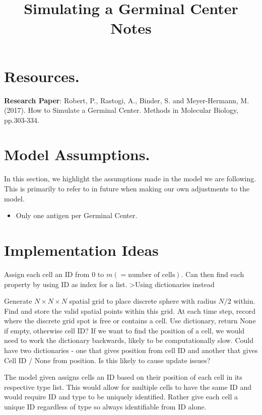 \documentclass[english]{article}
\begin{document}
\title{Simulating a Germinal Center Notes}
\maketitle

\tableofcontents
\pagebreak	

\section{Resources.}
\textbf{Research Paper}: Robert, P., Rastogi, A., Binder, S. and Meyer-Hermann, M. (2017). How to Simulate a Germinal Center. Methods in Molecular Biology, pp.303-334.


\section{Model Assumptions.}
In this section, we highlight the assumptions made in the model we are following. This is primarily to refer to in future when making our own adjustments to the model. 
\begin{itemize}
\item Only one antigen per Germinal Center. 

\end{itemize}


\section{Implementation Ideas}
Assign each cell an ID from 0 to $m(=\text{number of cells})$. Can then find each property by using ID as index for a list. >Using dictionaries instead

Generate $N\times N\times N$ spatial grid to place discrete sphere with radius $N/2$ within. Find and store the valid spatial points within this grid. At each time step, record where the discrete grid spot is free or contains a cell. Use dictionary, return None if empty, otherwise cell ID? If we want to find the position of a cell, we would need to work the dictionary backwards, likely to be computationally slow. Could have two dictionaries - one that gives position from cell ID and another that gives Cell ID / None from position. Is this likely to cause update issues?

The model given assigns cells an ID based on their position of each cell in its respective type list. This would allow for multiple cells to have the same ID and would require ID and type to be uniquely identified. Rather give each cell a unique ID regardless of type so always identifiable from ID alone. 
\end{document}

